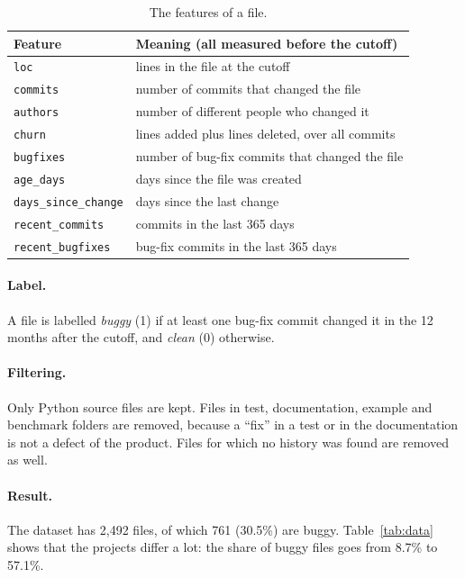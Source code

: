 \documentclass[11pt,a4paper]{article}
\begin{document}
\begin{table}[h]
\centering
\begin{tabular}{ll}
\toprule
Feature & Meaning (all measured before the cutoff) \\
\midrule
\texttt{loc} & lines in the file at the cutoff \\
\texttt{commits} & number of commits that changed the file \\
\texttt{authors} & number of different people who changed it \\
\texttt{churn} & lines added plus lines deleted, over all commits \\
\texttt{bugfixes} & number of bug-fix commits that changed the file \\
\texttt{age\_days} & days since the file was created \\
\texttt{days\_since\_change} & days since the last change \\
\texttt{recent\_commits} & commits in the last 365 days \\
\texttt{recent\_bugfixes} & bug-fix commits in the last 365 days \\
\bottomrule
\end{tabular}
\caption{The features of a file.}
\label{tab:features}
\end{table}

\paragraph{Label.} A file is labelled \emph{buggy} (1) if at least one bug-fix
commit changed it in the 12 months after the cutoff, and \emph{clean} (0)
otherwise.

\paragraph{Filtering.} Only Python source files are kept. Files in test,
documentation, example and benchmark folders are removed, because a ``fix'' in
a test or in the documentation is not a defect of the product. Files for which
no history was found are removed as well.

\paragraph{Result.} The dataset has 2,492 files, of which 761 (30.5\%) are
buggy. Table~\ref{tab:data} shows that the projects differ a lot: the share of
buggy files goes from 8.7\% to 57.1\%.
\end{document}
